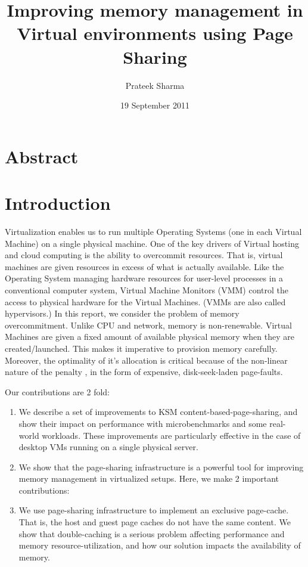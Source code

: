 \documentclass[10pt,a4paper]{article}
\title{Improving memory management in Virtual environments using Page Sharing}
\author{Prateek Sharma}
\date{19 September 2011}
\begin{document}
\maketitle


\section{Abstract}


\section{Introduction}

Virtualization enables us to run multiple Operating Systems (one in each Virtual Machine) on a single physical machine. One of the key drivers of Virtual hosting and cloud computing is the ability to overcommit resources. That is, virtual machines are given resources in excess of what is actually available.
Like the Operating System managing hardware resources for user-level processes in a conventional computer system, Virtual Machine Monitors (VMM) control the access to physical hardware for the Virtual Machines. (VMMs are also called hypervisors.)
In this report, we consider the problem of memory overcommitment. Unlike CPU and network, memory is non-renewable. Virtual Machines are given a fixed amount of available physical memory when they are created/launched. This makes it imperative to provision memory carefully. Moreover, the optimality of it's allocation is critical because of the non-linear nature of the penalty , in the form of expensive, disk-seek-laden page-faults. 


Our contributions are 2 fold: 
\begin{enumerate}
\item We describe a set of improvements to KSM content-based-page-sharing, and show their impact on performance with microbenchmarks and some real-world workloads. These improvements are particularly effective in the case of desktop VMs running on a single physical server.
\item We show that the page-sharing infrastructure is a powerful tool for improving memory management in virtualized setups. Here, we make 2 important contributions:
\item We use page-sharing infrastructure to implement an exclusive page-cache. That is, the host and guest page caches do not have the same content. We show that double-caching is a serious problem affecting performance and memory resource-utilization, and how our solution impacts the availability of memory.
\end{enumerate}
\end{document}
